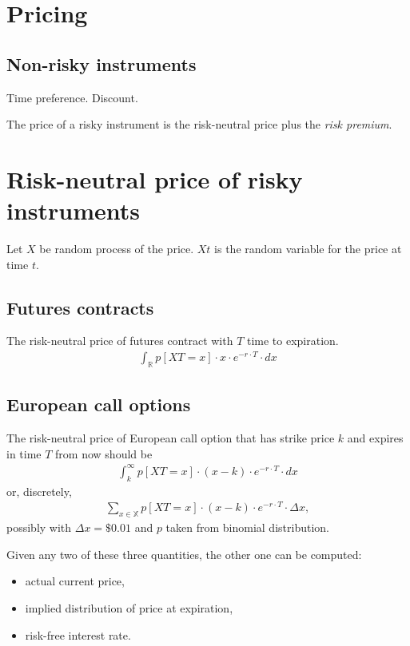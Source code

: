\chapter{Pricing}

\section{Non-risky instruments}

Time preference.
Discount.

The price of a risky instrument
is the risk-neutral price plus the \emph{risk premium}.

\chapter{Risk-neutral price of risky instruments}

Let $X$ be random process of the price.
$X t$ is the random variable for the price at time $t$.

\section{Futures contracts}

The risk-neutral price of futures contract with $T$ time to expiration.
\begin{align}
    \int_{\mathbb{R}} p [X T = x] \cdot x \cdot e^{- r \cdot T} \cdot dx
\end{align}

\section{European call options}

The risk-neutral price of European call option
that has strike price $k$ and expires in time $T$ from now
should be
\begin{align}
    \int_k^\infty p [X T = x] \cdot (x - k) \cdot e^{- r \cdot T} \cdot dx
\end{align}
or, discretely,
\begin{align}
    \sum_{x \in \mathbb{X}} p[X T = x] \cdot (x - k) \cdot e^{- r \cdot T} \cdot \Delta x,
\end{align}
possibly with $\Delta x = \$ 0.01$
and $p$ taken from binomial distribution.

Given any two of these three quantities,
the other one can be computed:
\begin{itemize}
    \item actual current price,
    \item implied distribution of price at expiration,
    \item risk-free interest rate.
\end{itemize}

